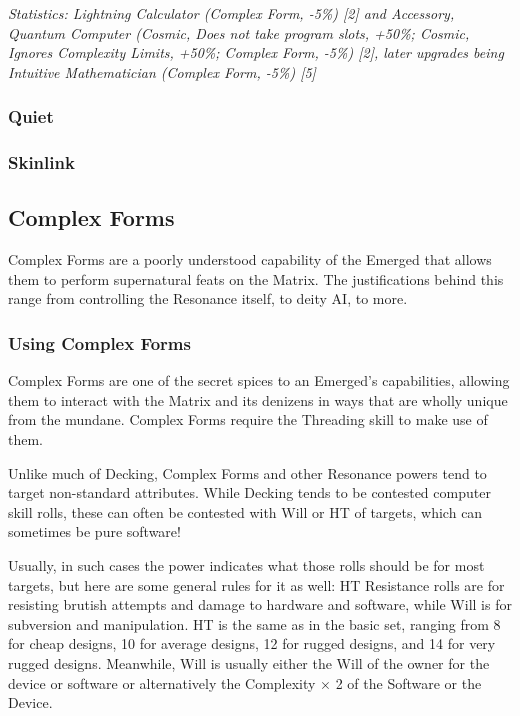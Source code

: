 \begin{multicols*}{3}
	\textit{\textcolor{OliveGreen}{Statistics: Lightning Calculator (Complex Form, -5\%) [2] and Accessory, Quantum Computer (Cosmic, Does not take program slots, +50\%; Cosmic, Ignores Complexity Limits, +50\%; Complex Form, -5\%) [2], later upgrades being Intuitive Mathematician (Complex Form, -5\%) [5] }}
	
	\subsubsection{Quiet}
	
	\subsubsection{Skinlink}
	
	\subsection{Complex Forms}
	
	Complex Forms are a poorly understood capability of the Emerged that allows them to perform supernatural feats on the Matrix. The justifications behind this range from controlling the Resonance itself, to deity AI, to more.
	
	\subsubsection{Using Complex Forms}
	
	Complex Forms are one of the secret spices to an Emerged's capabilities, allowing them to interact with the Matrix and its denizens in ways that are wholly unique from the mundane. Complex Forms require the Threading skill to make use of them.
	
	Unlike much of Decking, Complex Forms and other Resonance powers tend to target non-standard attributes. While Decking tends to be contested computer skill rolls, these can often be contested with Will or HT of targets, which can sometimes be pure software! 
	
	Usually, in such cases the power indicates what those rolls should be for most targets, but here are some general rules for it as well: HT Resistance rolls are for resisting brutish attempts and damage to hardware and software, while Will is for subversion and manipulation. HT is the same as in the basic set, ranging from 8 for cheap designs, 10 for average designs, 12 for rugged designs, and 14 for very rugged designs. Meanwhile, Will is usually either the Will of the owner for the device or software or alternatively the Complexity $\times$ 2 of the Software or the Device.
	

\end{multicols*}

